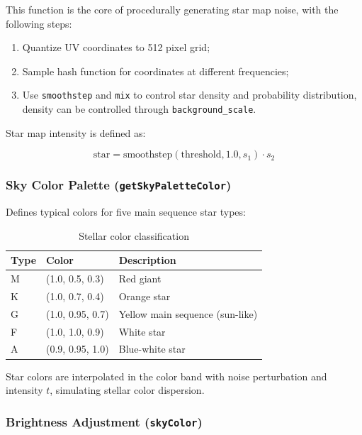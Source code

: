 \documentclass[11pt,a4paper]{article}
\begin{document}
This function is the core of procedurally generating star map noise, with the following steps:

\begin{enumerate}
    \item Quantize UV coordinates to 512 pixel grid;
    \item Sample hash function for coordinates at different frequencies;
    \item Use \texttt{smoothstep} and \texttt{mix} to control star density and probability distribution, density can be controlled through \texttt{background\_scale}.
\end{enumerate}

Star map intensity is defined as:

\begin{equation}
\text{star} = \text{smoothstep}(\text{threshold}, 1.0, s_1) \cdot s_2
\end{equation}

\subsubsection{Sky Color Palette (\texttt{getSkyPaletteColor})}

Defines typical colors for five main sequence star types:

\begin{table}[H]
\centering
\begin{tabular}{@{}lll@{}}
\toprule
Type & Color & Description \\
\midrule
M & (1.0, 0.5, 0.3) & Red giant \\
K & (1.0, 0.7, 0.4) & Orange star \\
G & (1.0, 0.95, 0.7) & Yellow main sequence (sun-like) \\
F & (1.0, 1.0, 0.9) & White star \\
A & (0.9, 0.95, 1.0) & Blue-white star \\
\bottomrule
\end{tabular}
\caption{Stellar color classification}
\end{table}

Star colors are interpolated in the color band with noise perturbation and intensity $t$, simulating stellar color dispersion.

\subsubsection{Brightness Adjustment (\texttt{skyColor})}
\end{document}
